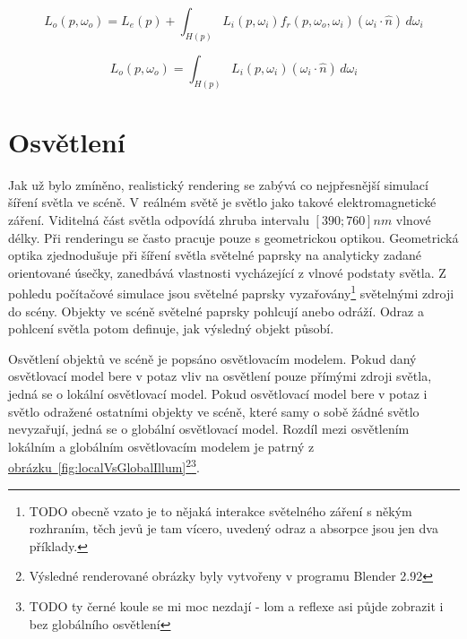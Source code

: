 \documentclass[czech,master]{diploma}
\newcommand{\interval}[1]{\left[{#1}\right]}
\newcommand{\uvec}[1]{\hat{#1}}
\newcommand{\point}{p}
\newcommand{\brdf}{f_r\left(\point,\omega_{o},\omega_{i}\right)}
\newcommand{\normVec}{\uvec{n}}
\newcommand{\inVec}{\omega_{i}}
\newcommand{\outVec}{\omega_{o}}
\newcommand{\outRadiance}{L_o\left(\point,\outVec\right)}
\newcommand{\inRadiance}{L_i\left(\point,\inVec\right)}
\newcommand{\emitRadiance}{L_e\left(\point\right)}
\newcommand{\inDotNorm}{\left(\inVec\cdot\normVec\right)}
\begin{document}
\begin{equation} \label{eq:render}
  \outRadiance = \emitRadiance + \int_{H \left( \point \right)}^{~}\inRadiance \brdf \inDotNorm \,d\inVec
\end{equation}

\begin{equation} \label{eq:renderIrradiance}
  \outRadiance = \int_{H \left( \point \right)}^{~}\inRadiance \inDotNorm \,d\inVec
\end{equation}

\section{Osvětlení}
Jak už bylo zmíněno, realistický rendering se zabývá co nejpřesnější simulací šíření světla ve scéně. V reálném světě je světlo jako takové elektromagnetické záření. Viditelná část světla odpovídá zhruba intervalu \(\interval{390;760}nm\) vlnové délky. Při renderingu se často pracuje pouze s geometrickou optikou. Geometrická optika zjednodušuje při šíření světla světelné paprsky na analyticky zadané orientované úsečky, zanedbává vlastnosti vycházející z vlnové podstaty světla. Z pohledu počítačové simulace jsou světelné paprsky vyzařovány\footnote{TODO obecně vzato je to nějaká interakce světelného záření s někým rozhraním, těch jevů je tam vícero, uvedený odraz a absorpce jsou jen dva příklady.} světelnými zdroji do scény. Objekty ve scéně světelné paprsky pohlcují anebo odráží. Odraz a pohlcení světla potom definuje, jak výsledný objekt působí. \par
Osvětlení objektů ve scéně je popsáno osvětlovacím modelem. Pokud daný osvětlovací model bere v potaz vliv na osvětlení pouze přímými zdroji světla, jedná se o lokální osvětlovací model. Pokud osvětlovací model bere v potaz i světlo odražené ostatními objekty ve scéně, které samy o sobě žádné světlo nevyzařují, jedná se o globální osvětlovací model. Rozdíl mezi osvětlením lokálním a globálním osvětlovacím modelem je patrný z \hyperref[fig:localVsGlobalIllum]{obrázku~\ref{fig:localVsGlobalIllum}}\footnote{Výsledné renderované obrázky byly vytvořeny v programu Blender 2.92}\footnote{TODO ty černé koule se mi moc nezdají - lom a reflexe asi půjde zobrazit i bez globálního osvětlení}.
\end{document}
